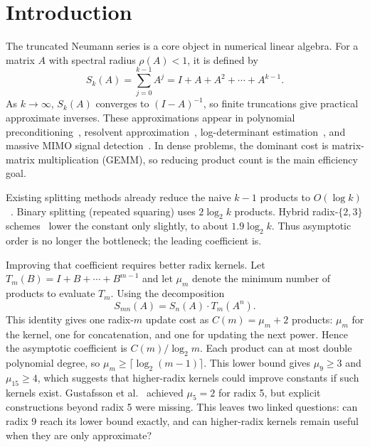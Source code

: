 \documentclass[
  journal=largetwo,
  manuscript=article,
  manuscriptlabel={Research Preprint},
  logo=false,
  simfonts=false,
  year=2026,
  volume=1,
]{cup-journal}
\theoremstyle{definition}
\theoremstyle{remark}
\newcommand{\paperbibliography}{\printbibliography}
\begin{document}


\section{Introduction}
\label{sec:introduction}

The truncated Neumann series is a core object in numerical linear algebra.
For a matrix $A$ with spectral radius $\rho(A) < 1$, it is defined by
\begin{equation}
  \label{eq:neumann}
  S_k(A) = \sum_{j=0}^{k-1} A^j = I + A + A^2 + \cdots + A^{k-1}.
\end{equation}
As $k \to \infty$, $S_k(A)$ converges to $(I-A)^{-1}$, so finite truncations give
practical approximate inverses.
These approximations appear in polynomial preconditioning~\cite{dubois1979,saad2003},
resolvent approximation~\cite{higham2008}, log-determinant estimation~\cite{sao2025logdet},
and massive MIMO signal detection~\cite{gustafsson2017}.
In dense problems, the dominant cost is matrix-matrix multiplication (GEMM), so
reducing product count is the main efficiency goal.

Existing splitting methods already reduce the naive $k-1$ products to
$O(\log k)$~\cite{lei1992}.
Binary splitting (repeated squaring) uses $2\log_2 k$ products.
Hybrid radix-$\{2,3\}$ schemes~\cite{dimitrov1995} lower the constant only
slightly, to about $1.9\log_2 k$.
Thus asymptotic order is no longer the bottleneck; the leading coefficient is.

Improving that coefficient requires better radix kernels.
Let $T_m(B)=I+B+\cdots+B^{m-1}$ and let $\mu_m$ denote the minimum number of
products to evaluate $T_m$.
Using the decomposition
\begin{equation}
  \label{eq:decomposition}
  S_{mn}(A) = S_n(A) \cdot T_m(A^n).
\end{equation}
This identity gives one radix-$m$ update cost as
$C(m)=\mu_m+2$ products: $\mu_m$ for the kernel, one
for concatenation, and one for updating the next power.
Hence the asymptotic coefficient is $C(m)/\log_2 m$.
Each product can at most double polynomial degree, so
$\mu_m \ge \lceil\log_2(m-1)\rceil$.
This lower bound gives $\mu_9 \ge 3$ and $\mu_{15} \ge 4$, which suggests that
higher-radix kernels could improve constants if such kernels exist.
Gustafsson et al.~\cite{gustafsson2017} achieved $\mu_5 = 2$ for radix 5, but
explicit constructions beyond radix 5 were missing.
This leaves two linked questions: can radix 9 reach its lower bound exactly, and
can higher-radix kernels remain useful when they are only approximate?
\end{document}
